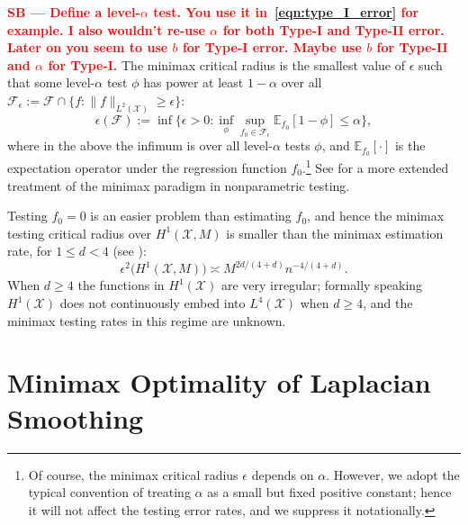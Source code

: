 \documentclass[twoside]{article}
\newcommand{\red}[1]{\textcolor{red}{#1}}
\newcommand{\sbcomment}[1]{{\bf{{\red{{SB --- #1}}}}}}
\newcommand{\1}{\mathbf{1}}
\newcommand{\Xset}{\mathcal{X}}
\newcommand{\Leb}{L}
\newcommand{\mc}[1]{\mathcal{#1}}
\newcommand{\Ebb}{\mathbb{E}}
\theoremstyle{definition}
\theoremstyle{remark}
\begin{document}
\sbcomment{Define a level-$\alpha$ test. You use it in~\eqref{eqn:type_I_error} for example. I also wouldn't re-use $\alpha$ for both Type-I and Type-II error. Later on you seem to use $b$ for Type-I error. Maybe use $b$ for Type-II and $\alpha$ for Type-I.} The minimax critical radius is the smallest value of $\epsilon$ such that some level-${\alpha}$ test $\phi$ has power at least $1 - \alpha$ over all $\mc{F}_{\epsilon} := \mc{F} \cap \{f: \|f\|_{\Leb^2(\Xset)} \geq \epsilon\}$:
\begin{equation*}
\epsilon(\mc{F}) := \inf\biggl\{\epsilon > 0: \inf_{\phi} \sup_{f_0 \in \mc{F}_{\epsilon}} \Ebb_{f_0}[1 - \phi] \leq \alpha \biggr\},
\end{equation*} 
where in the above the infimum is over all level-$\alpha$ tests $\phi$, and $\Ebb_{f_0}[\cdot]$ is the expectation operator under the regression function $f_0$.\footnote{Of course, the minimax critical radius $\epsilon$ depends on $\alpha$. However, we adopt the typical convention of treating $\alpha$ as a small but fixed positive constant; hence it will not affect the testing error rates, and we suppress it notationally.} See \citet{ingster82,ingster87,ingster2012} for a more extended treatment of the minimax paradigm in nonparametric testing. 

Testing $f_0=0$ is an easier problem than estimating $f_0$, and hence the minimax testing critical radius over $H^1(\Xset,M)$ is smaller than the minimax estimation rate, for $1 \leq d < 4$ (see \citet{ingster2009}):
\begin{equation}
\label{eqn:sobolev_space_testing_critical_radius}
\epsilon^2\bigl(H^1(\Xset,M)\bigr) \asymp M^{2d/(4 + d)}n^{-4/(4 + d)}.
\end{equation}
When $d \geq 4$ the functions in $H^1(\Xset)$ are very irregular; formally speaking $H^1(\Xset)$ does not continuously embed into $\Leb^4(\Xset)$ when $d \geq 4$, and the minimax testing rates in this regime are unknown. 

\section{Minimax Optimality of Laplacian Smoothing}
\label{sec:minimax_optimal_laplacian_smoothing}
\end{document}
